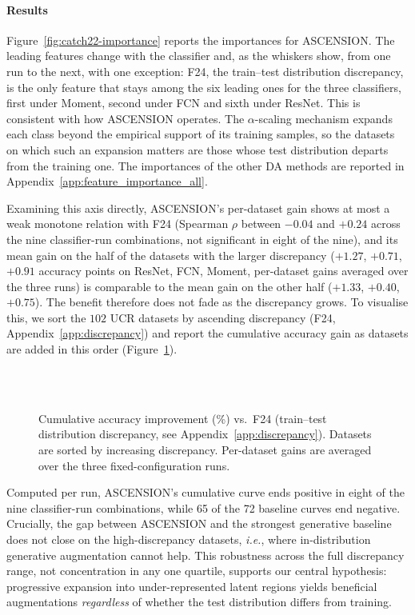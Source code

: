 \paragraph{Results}
Figure~\ref{fig:catch22-importance} reports the importances for
ASCENSION. The leading features change with the classifier and, as
the whiskers show, from one run to the next, with one exception:
F24, the train--test distribution discrepancy, is the only feature
that stays among the six leading ones for the three classifiers,
first under Moment, second under FCN and sixth under ResNet. This is
consistent with how ASCENSION operates. The $\alpha$-scaling
mechanism expands each class beyond the empirical support of its
training samples, so the datasets on which such an expansion matters
are those whose test distribution departs from the training one. The
importances of the other DA methods are reported in
Appendix~\ref{app:feature_importance_all}.

\label{sec:analysis:discrepancy}
Examining this axis directly, ASCENSION's per-dataset gain shows at
most a weak monotone relation with F24 (Spearman $\rho$ between
$-0.04$ and $+0.24$ across the nine classifier-run combinations, not
significant in eight of the nine), and its mean gain on the half of
the datasets with the larger discrepancy ($+1.27$, $+0.71$, $+0.91$
accuracy points on ResNet, FCN, Moment, per-dataset gains averaged
over the three runs) is comparable to the mean gain on the other half
($+1.33$, $+0.40$, $+0.75$). The benefit therefore does not fade as
the discrepancy grows. To visualise this, we sort the $102$ UCR
datasets by ascending discrepancy (F24, Appendix~\ref{app:discrepancy})
and report the cumulative accuracy gain as datasets are added in
this order (Figure~\ref{fig:cumsum-disc}).

\begin{figure}[!t]
\centering
\daLegendBlock\par\smallskip
\resizebox{\linewidth}{!}{}\\
\resizebox{\linewidth}{!}{}\\
\resizebox{\linewidth}{!}{}

\caption{Cumulative accuracy improvement (\%) vs.\ F24
(train--test distribution discrepancy, see
Appendix~\ref{app:discrepancy}). Datasets are sorted by increasing
discrepancy. Per-dataset gains are averaged over the three
fixed-configuration runs.}
\label{fig:cumsum-disc}
\end{figure}

Computed per run, ASCENSION's cumulative curve ends positive in
eight of the nine classifier-run combinations, while 65 of the 72
baseline curves end negative. Crucially, the gap between ASCENSION and
the strongest generative baseline does not close on the
high-discrepancy datasets, \textit{i.e.}, where
in-distribution generative augmentation cannot help. This
robustness across the full discrepancy range, not concentration
in any one quartile, supports our central hypothesis:
progressive expansion into under-represented latent regions
yields beneficial augmentations \emph{regardless} of whether the
test distribution differs from training.


